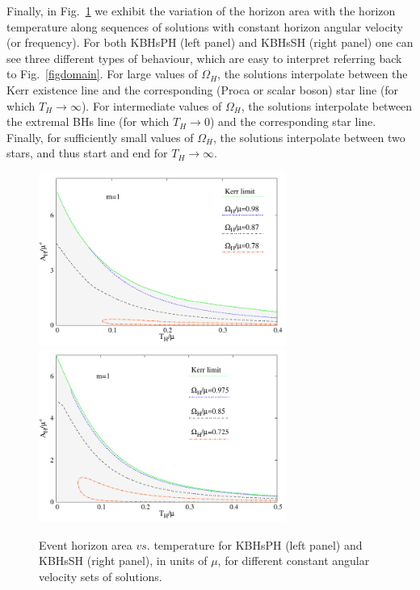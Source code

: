 Finally, in Fig.~\ref{temperature} we exhibit the variation of the horizon area with the horizon temperature along sequences of solutions with constant horizon angular velocity (or frequency). For both KBHsPH (left panel) and KBHsSH (right panel) one can see three different types of behaviour, which are easy to interpret referring back to Fig.~\ref{figdomain}. For large values of $\Omega_H$, the solutions interpolate between the Kerr existence line and the corresponding (Proca or scalar boson) star line (for which $T_H\rightarrow \infty$). For intermediate values of $\Omega_H$, the solutions interpolate between the extremal BHs line (for which $T_H\rightarrow 0$) and the corresponding star line. Finally, for sufficiently small values of $\Omega_H$, the solutions interpolate between two stars, and thus start and end for $T_H\rightarrow \infty$.


\begin{figure}[h!]
  \begin{center}
    \includegraphics[width=8.1cm]{papers/Proca/BH-TH-AH.pdf}
      \includegraphics[width=8.1cm]{papers/Proca/scalar-BH-TH-AH.pdf}
  \end{center}
 \caption{Event horizon area $vs.$ temperature for KBHsPH (left panel) and KBHsSH (right panel), in units of $\mu$, for different constant angular velocity sets of solutions.}
  \label{temperature}
\end{figure}






